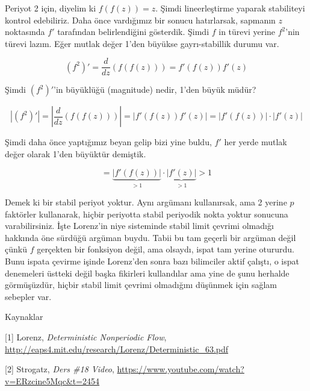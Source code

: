 \documentclass[12pt,fleqn]{article}\usepackage{../../common}
\begin{document}
Periyot 2 için, diyelim ki $f(f(z)) = z$. Şimdi lineerleştirme yaparak
stabiliteyi kontrol edebiliriz. Daha önce vardığımız bir sonucu
hatırlarsak, sapmanın $z$ noktasında $f'$ tarafından belirlendiğini
gösterdik. Şimdi $f$ in türevi yerine $f^2$'nin türevi lazım. Eğer mutlak
değer 1'den büyükse gayrı-stabillik durumu var. 

$$ 
(f^2)' 
= \frac{d}{dz} ( f(f(z)) ) = f'(f(z)) f'(z)
$$

Şimdi $(f^2)'$'in büyüklüğü (magnitude) nedir, 1'den büyük müdür? 

$$ 
|(f^2)'| = 
|\frac{d}{dz} ( f(f(z)) )| = 
|f'(f(z)) f'(z)| = | f'(f(z))|\cdot|f'(z)|
$$

Şimdi daha önce yaptığımız beyan gelip bizi yine buldu, $f'$ her yerde
mutlak değer olarak 1'den büyüktür demiştik. 

$$ 
= \underbrace{| f'(f(z))|}_{>1} \cdot \underbrace{|f'(z)|}_{>1} > 1
$$

Demek ki bir stabil periyot yoktur. Aynı argümanı kullanırsak, ama 2 yerine
$p$ faktörler kullanarak, hiçbir periyotta stabil periyodik nokta yoktur
sonucuna varabilirsiniz. İşte Lorenz'in niye sisteminde stabil limit
çevrimi olmadığı hakkında öne sürdüğü argüman buydu. Tabii bu tam geçerli
bir argüman değil çünkü $f$ gerçekten bir fonksiyon değil, ama olsaydı,
ispat tam yerine otururdu. Bunu ispata çevirme işinde Lorenz'den sonra bazı
bilimciler aktif çalıştı, o ispat denemeleri üstteki değil başka fikirleri
kullandılar ama yine de şunu herhalde görmüşüzdür, hiçbir stabil limit
çevrimi olmadığını düşünmek için sağlam sebepler var. 

Kaynaklar

[1] Lorenz, {\em Deterministic Nonperiodic Flow}, \url{http://eaps4.mit.edu/research/Lorenz/Deterministic_63.pdf}

[2] Strogatz, {\em Ders \#18 Video}, \url{https://www.youtube.com/watch?v=ERzcine5Mqc&t=2454}
\end{document}
